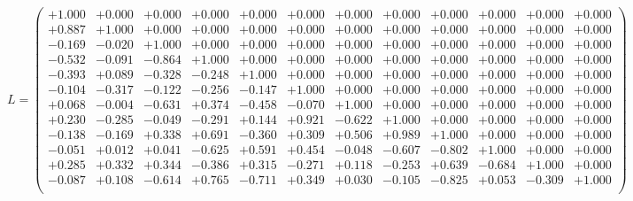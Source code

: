 \documentclass[9pt]{article}
\theoremstyle{plain}
\theoremstyle{definition}
\theoremstyle{remark}
\numberwithin{equation}{section}
\begin{document}
$L = \left(
\begin{array}{
cccccccccccc}
+1.000 & +0.000 & +0.000 & +0.000 & +0.000 & +0.000 & +0.000 & +0.000 & +0.000 & +0.000 & +0.000 & +0.000 \\
+0.887 & +1.000 & +0.000 & +0.000 & +0.000 & +0.000 & +0.000 & +0.000 & +0.000 & +0.000 & +0.000 & +0.000 \\
-0.169 & -0.020 & +1.000 & +0.000 & +0.000 & +0.000 & +0.000 & +0.000 & +0.000 & +0.000 & +0.000 & +0.000 \\
-0.532 & -0.091 & -0.864 & +1.000 & +0.000 & +0.000 & +0.000 & +0.000 & +0.000 & +0.000 & +0.000 & +0.000 \\
-0.393 & +0.089 & -0.328 & -0.248 & +1.000 & +0.000 & +0.000 & +0.000 & +0.000 & +0.000 & +0.000 & +0.000 \\
-0.104 & -0.317 & -0.122 & -0.256 & -0.147 & +1.000 & +0.000 & +0.000 & +0.000 & +0.000 & +0.000 & +0.000 \\
+0.068 & -0.004 & -0.631 & +0.374 & -0.458 & -0.070 & +1.000 & +0.000 & +0.000 & +0.000 & +0.000 & +0.000 \\
+0.230 & -0.285 & -0.049 & -0.291 & +0.144 & +0.921 & -0.622 & +1.000 & +0.000 & +0.000 & +0.000 & +0.000 \\
-0.138 & -0.169 & +0.338 & +0.691 & -0.360 & +0.309 & +0.506 & +0.989 & +1.000 & +0.000 & +0.000 & +0.000 \\
-0.051 & +0.012 & +0.041 & -0.625 & +0.591 & +0.454 & -0.048 & -0.607 & -0.802 & +1.000 & +0.000 & +0.000 \\
+0.285 & +0.332 & +0.344 & -0.386 & +0.315 & -0.271 & +0.118 & -0.253 & +0.639 & -0.684 & +1.000 & +0.000 \\
-0.087 & +0.108 & -0.614 & +0.765 & -0.711 & +0.349 & +0.030 & -0.105 & -0.825 & +0.053 & -0.309 & +1.000 \\
\end{array}
\right)$ \newline 
\end{document}
